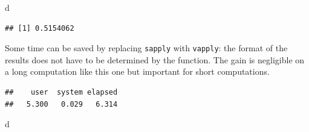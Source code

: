 \documentclass[
  12pt,
  american,
  a4paper,
  extrafontsizes,onecolumn,openright
  ]{memoir}
\newenvironment{Shaded}{\begin{snugshade}}{\end{snugshade}}
\newcommand{\ControlFlowTok}[1]{\textcolor[rgb]{0.13,0.29,0.53}{\textbf{#1}}}
\newcommand{\DecValTok}[1]{\textcolor[rgb]{0.00,0.00,0.81}{#1}}
\newcommand{\FunctionTok}[1]{\textcolor[rgb]{0.00,0.00,0.00}{#1}}
\newcommand{\NormalTok}[1]{#1}
\newcommand{\OtherTok}[1]{\textcolor[rgb]{0.56,0.35,0.01}{#1}}
\newcommand{\SpecialCharTok}[1]{\textcolor[rgb]{0.00,0.00,0.00}{#1}}
\begin{document}
\begin{Shaded}
\begin{Highlighting}[]
\NormalTok{d}
\end{Highlighting}
\end{Shaded}

\begin{verbatim}
## [1] 0.5154062
\end{verbatim}

\normalsize

Some time can be saved by replacing \texttt{sapply} with \texttt{vapply}: the format of the results does not have to be determined by the function.
The gain is negligible on a long computation like this one but important for short computations.

\scriptsize

\begin{Shaded}
\end{Shaded}

\begin{verbatim}
##    user  system elapsed 
##   5.300   0.029   6.314
\end{verbatim}

\begin{Shaded}
\begin{Highlighting}[]
\NormalTok{d}
\end{Highlighting}
\end{Shaded}
\end{document}
